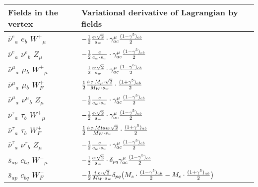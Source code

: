 \begin{center}
\begin{tabular}{|l|l|} \hline
Fields in the vertex & Variational derivative of Lagrangian by fields \\ \hline
$\bar{\nu}^e{}_{a }$ \phantom{-} $e{}_{b }$ \phantom{-} $W^+{}_{\mu }$ \phantom{-}  &
	$-\frac{1}{2}\frac{ e \cdot\sqrt{2}}{ s_w}\cdot \gamma_{a c}^\mu {(1-\gamma^5)_{c b}\over 2} $\\[2mm]
$\bar{\nu}^e{}_{a }$ \phantom{-} $\nu^e{}_{b }$ \phantom{-} ${Z}_{\mu }$ \phantom{-}  &
	$-\frac{1}{2}\frac{ e}{ c_w \cdot s_w}\cdot \gamma_{a c}^\mu {(1-\gamma^5)_{c b}\over 2} $\\[2mm]
$\bar{\nu}^\mu{}_{a }$ \phantom{-} $\mu{}_{b }$ \phantom{-} $W^+{}_{\mu }$ \phantom{-}  &
	$-\frac{1}{2}\frac{ e \cdot\sqrt{2}}{ s_w}\cdot \gamma_{a c}^\mu {(1-\gamma^5)_{c b}\over 2} $\\[2mm]
$\bar{\nu}^\mu{}_{a }$ \phantom{-} $\mu{}_{b }$ \phantom{-} $W^+_F{}_{}$ \phantom{-}  &
	$\frac{1}{2}\frac{ i \cdot e \cdot M_\mu \cdot\sqrt{2}}{ M_W \cdot s_w}\cdot {(1+\gamma^5)_{a b}\over 2} $\\[2mm]
$\bar{\nu}^\mu{}_{a }$ \phantom{-} $\nu^\mu{}_{b }$ \phantom{-} ${Z}_{\mu }$ \phantom{-}  &
	$-\frac{1}{2}\frac{ e}{ c_w \cdot s_w}\cdot \gamma_{a c}^\mu {(1-\gamma^5)_{c b}\over 2} $\\[2mm]
$\bar{\nu}^\tau{}_{a }$ \phantom{-} $\tau{}_{b }$ \phantom{-} $W^+{}_{\mu }$ \phantom{-}  &
	$-\frac{1}{2}\frac{ e \cdot\sqrt{2}}{ s_w}\cdot \gamma_{a c}^\mu {(1-\gamma^5)_{c b}\over 2} $\\[2mm]
$\bar{\nu}^\tau{}_{a }$ \phantom{-} $\tau{}_{b }$ \phantom{-} $W^+_F{}_{}$ \phantom{-}  &
	$\frac{1}{2}\frac{ i \cdot e \cdot Mtau \cdot\sqrt{2}}{ M_W \cdot s_w}\cdot {(1+\gamma^5)_{a b}\over 2} $\\[2mm]
$\bar{\nu}^\tau{}_{a }$ \phantom{-} $\nu^\tau{}_{b }$ \phantom{-} ${Z}_{\mu }$ \phantom{-}  &
	$-\frac{1}{2}\frac{ e}{ c_w \cdot s_w}\cdot \gamma_{a c}^\mu {(1-\gamma^5)_{c b}\over 2} $\\[2mm]
$\bar{s}{}_{a p }$ \phantom{-} $c{}_{b q }$ \phantom{-} $W^-{}_{\mu }$ \phantom{-}  &
	$-\frac{1}{2}\frac{ e \cdot\sqrt{2}}{ s_w}\cdot \delta_{p q} \gamma_{a c}^\mu {(1-\gamma^5)_{c b}\over 2} $\\[2mm]
$\bar{s}{}_{a p }$ \phantom{-} $c{}_{b q }$ \phantom{-} $W^-_F{}_{}$ \phantom{-}  &
	$-\frac{1}{2}\frac{ i \cdot e \cdot\sqrt{2}}{ M_W \cdot s_w}\delta_{p q} \big( M_s\cdot {(1-\gamma^5)_{a b}\over 2} - M_c\cdot {(1+\gamma^5)_{a b}\over 2} \big)$\\[2mm]

\end{tabular}
\end{center}
